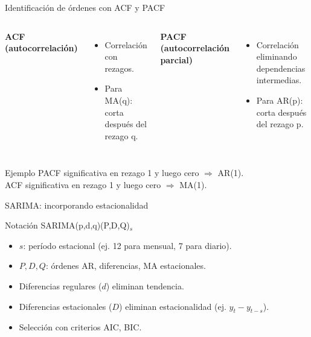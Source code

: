 \documentclass[aspectratio=169, 10pt, xcolor=table]{beamer}
\begin{document}
\begin{frame}{Identificación de órdenes con ACF y PACF}
    \begin{columns}[t]
        \textbf{ACF (autocorrelación)}
        \begin{itemize}
            \item Correlación con rezagos.
            \item Para MA(q): corta después del rezago q.
        \end{itemize}
        \textbf{PACF (autocorrelación parcial)}
        \begin{itemize}
            \item Correlación eliminando dependencias intermedias.
            \item Para AR(p): corta después del rezago p.
        \end{itemize}
    \end{columns}
    \vspace{0.3cm}
    \begin{exampleblock}{Ejemplo}
        PACF significativa en rezago 1 y luego cero $\Rightarrow$ AR(1). \\
        ACF significativa en rezago 1 y luego cero $\Rightarrow$ MA(1).
    \end{exampleblock}
\end{frame}

\begin{frame}{SARIMA: incorporando estacionalidad}
    \begin{block}{Notación SARIMA(p,d,q)(P,D,Q)$_s$}
        \begin{itemize}
            \item $s$: período estacional (ej. 12 para mensual, 7 para diario).
            \item $P, D, Q$: órdenes AR, diferencias, MA estacionales.
        \end{itemize}
    \end{block}
    \begin{itemize}
        \item Diferencias regulares ($d$) eliminan tendencia.
        \item Diferencias estacionales ($D$) eliminan estacionalidad (ej. $y_t - y_{t-s}$).
        \item Selección con criterios AIC, BIC.
    \end{itemize}
\end{frame}
\end{document}

